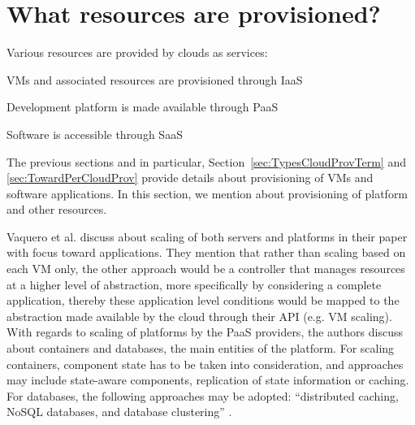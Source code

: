 \documentclass[10pt,journal,cspaper,compsoc]{IEEEtran}
\begin{document}
\section{What resources are provisioned?}
\label{sec:ServiceProv}
Various resources are provided by clouds as services:
\begin{IEEEenumerate}
\item VMs and associated resources are provisioned through IaaS
\item Development platform is made available through PaaS
\item Software is accessible through SaaS
\end{IEEEenumerate}

The previous sections and in particular, Section~\ref{sec:TypesCloudProvTerm} and \ref{sec:TowardPerCloudProv} provide details about provisioning of VMs and software applications. In this section, we mention about provisioning of platform and other resources. 

Vaquero et al. \cite{2011_DynamicallyScalingApps} discuss about scaling of both servers and platforms in their paper with focus toward applications. They mention that rather than scaling based on each VM only, the other approach would be a controller that manages resources at a higher level of abstraction, more specifically by considering a complete application, thereby these application level conditions would be mapped to the abstraction made available by the cloud through their API (e.g. VM scaling). With regards to scaling of platforms by the PaaS providers, the authors discuss about containers and databases, the main entities of the platform. For scaling containers, component state has to be taken into consideration, and approaches may include state-aware components, replication of state information or caching. For databases, the following approaches may be adopted: ``distributed caching, NoSQL databases, and database clustering'' \cite{2011_DynamicallyScalingApps}.
\end{document}
